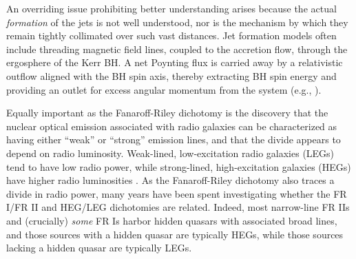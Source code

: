 An overriding issue prohibiting better understanding arises because 
the  actual
{\it formation} of the jets is not  well understood, nor is the mechanism by
which they  remain tightly collimated  over such vast  distances.  Jet
formation models often include threading magnetic field lines, coupled
to the  accretion flow, through the  ergosphere of the Kerr  BH. A net
Poynting flux is  carried away by a relativistic  outflow aligned with
the BH spin  axis, thereby extracting BH spin  energy and providing an
outlet for excess angular momentum from the system (e.g., 
\citealt{blandford77,blandford82,punsly90,meier99,devilliers05}). 






Equally important as the Fanaroff-Riley dichotomy is the discovery that 
the nuclear optical emission associated with radio galaxies can be characterized 
as having either ``weak'' or ``strong'' emission lines, and that the divide 
appears to depend on radio luminosity. Weak-lined, low-excitation radio galaxies (LEGs) 
tend to have low radio power, while strong-lined, high-excitation galaxies (HEGs) have higher 
radio luminosities \citep{hine79,laing94,rector01}. As the Fanaroff-Riley dichotomy also traces a divide in radio power, 
many years have been spent investigating whether the FR I/FR II and HEG/LEG dichotomies 
are related. Indeed, most narrow-line FR IIs and (crucially) {\it some} FR Is harbor 
hidden quasars with associated broad lines, and those sources with a hidden quasar 
are typically HEGs, while those sources lacking a hidden quasar are typically LEGs. 



